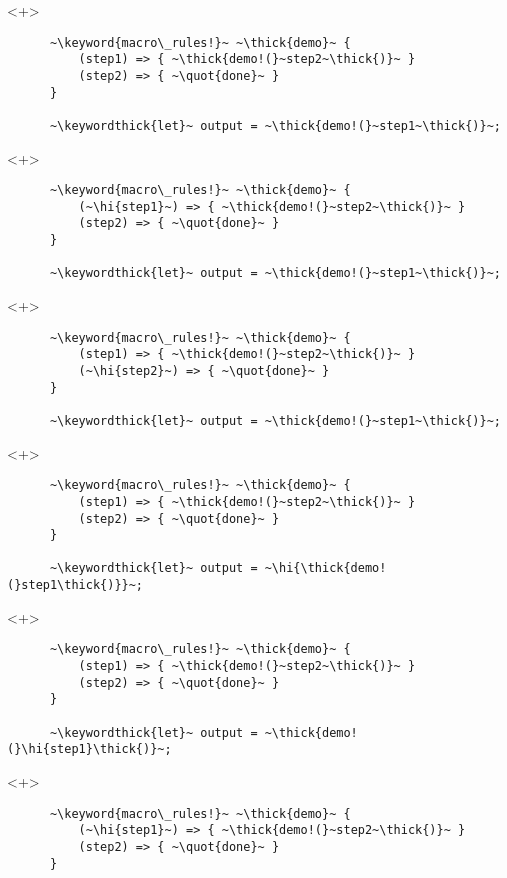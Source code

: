 \documentclass[usepdftitle=false]{beamer}
\newcommand{\thick}[1]{\contourlength{0.16pt}\contour[10]{black}{#1}}
\newcommand{\slantbox}[2][.5]
  {%
    \mbox
      {%
        \sbox{\foobox}{#2}%
        \hskip\wd\foobox
        \pdfsave
        \pdfsetmatrix{1 0 #1 1}%
        \llap{\usebox{\foobox}}%
        \pdfrestore
      }%
  }
\newcommand{\backslantbox}[2][.5]
  {%
    \mbox
      {%
        \sbox{\foobox}{#2}%
        \hskip\wd\foobox
        \pdfsave
        \pdfsetmatrix{-1 0 #1 1}%
        \llap{\usebox{\foobox}}%
        \pdfrestore
      }%
  }
\newcommand{\hi}[1]{%
\tikz[baseline=(A.base)]
 \node[highlighting=yellowbg,inner sep=0pt,text depth=0pt] (A) {#1};%
}
\newcommand{\openquote}{\backslantbox[.2]{\hspace{11pt}''\hspace{-11pt}}}
\newcommand{\closequote}{\slantbox[-.2]{\hspace{2pt}''\hspace{-2pt}}}
\newcommand{\blackquote}[1]{\openquote#1\closequote}
\newcommand{\quot}[1]{{\color{redish}\blackquote{#1}}}
\newcommand{\keyword}[1]{\color{greenish}#1}
\newcommand{\keywordthick}[1]{\color{greenish}\contourlength{0.20pt}\contour[10]{greenish}{#1}}
\begin{document}
\begin{frame}[fragile]
  \begin{onlyenv}<+>
    \begin{verbatim}
      ~\keyword{macro\_rules!}~ ~\thick{demo}~ {
          (step1) => { ~\thick{demo!(}~step2~\thick{)}~ }
          (step2) => { ~\quot{done}~ }
      }

      ~\keywordthick{let}~ output = ~\thick{demo!(}~step1~\thick{)}~;
    \end{verbatim}
  \end{onlyenv}
  \begin{onlyenv}<+>
    \begin{verbatim}
      ~\keyword{macro\_rules!}~ ~\thick{demo}~ {
          (~\hi{step1}~) => { ~\thick{demo!(}~step2~\thick{)}~ }
          (step2) => { ~\quot{done}~ }
      }

      ~\keywordthick{let}~ output = ~\thick{demo!(}~step1~\thick{)}~;
    \end{verbatim}
  \end{onlyenv}
  \begin{onlyenv}<+>
    \begin{verbatim}
      ~\keyword{macro\_rules!}~ ~\thick{demo}~ {
          (step1) => { ~\thick{demo!(}~step2~\thick{)}~ }
          (~\hi{step2}~) => { ~\quot{done}~ }
      }

      ~\keywordthick{let}~ output = ~\thick{demo!(}~step1~\thick{)}~;
    \end{verbatim}
  \end{onlyenv}
  \begin{onlyenv}<+>
    \begin{verbatim}
      ~\keyword{macro\_rules!}~ ~\thick{demo}~ {
          (step1) => { ~\thick{demo!(}~step2~\thick{)}~ }
          (step2) => { ~\quot{done}~ }
      }

      ~\keywordthick{let}~ output = ~\hi{\thick{demo!(}step1\thick{)}}~;
    \end{verbatim}
  \end{onlyenv}
  \begin{onlyenv}<+>
    \begin{verbatim}
      ~\keyword{macro\_rules!}~ ~\thick{demo}~ {
          (step1) => { ~\thick{demo!(}~step2~\thick{)}~ }
          (step2) => { ~\quot{done}~ }
      }

      ~\keywordthick{let}~ output = ~\thick{demo!(}\hi{step1}\thick{)}~;
    \end{verbatim}
  \end{onlyenv}
  \begin{onlyenv}<+>
    \begin{verbatim}
      ~\keyword{macro\_rules!}~ ~\thick{demo}~ {
          (~\hi{step1}~) => { ~\thick{demo!(}~step2~\thick{)}~ }
          (step2) => { ~\quot{done}~ }
      }


\end{verbatim}
\end{onlyenv}
\end{frame}
\end{document}
